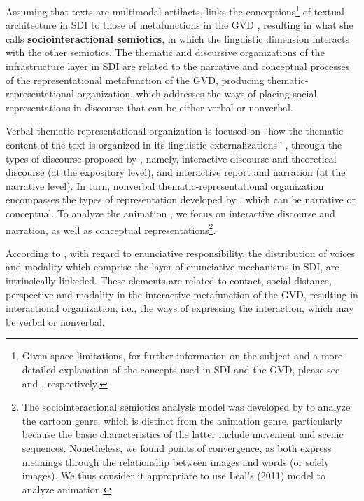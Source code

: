 \documentclass[english]{textolivre}
\begin{document}
Assuming that texts are multimodal artifacts, \textcite{leal2011organizaccao} links the conceptions\footnote{Given space limitations, for further information on the subject and a more detailed explanation of the concepts used in SDI and the GVD, please see \textcite{bronckart2012} and \textcite{kress2006reading}, respectively.} of textual architecture in SDI \cite{bronckart2012} to those of metafunctions in the GVD \cite{kress2006reading}, resulting in what she calls \textbf{sociointeractional semiotics}, in which the linguistic dimension interacts with the other semiotics. The thematic and discursive organizations of the infrastructure layer in SDI are related to the narrative and conceptual processes of the representational metafunction of the GVD, producing thematic-representational organization, which addresses the ways of placing social representations in discourse that can be either verbal or nonverbal. 

Verbal thematic-representational organization is focused on “how the thematic content of the text is organized in its linguistic externalizations” \cite[p. 206]{leal2011organizaccao}, through the types of discourse proposed by \textcite{bronckart2012}, namely, interactive discourse and theoretical discourse (at the expository level), and interactive report and narration (at the narrative level). In turn, nonverbal thematic-representational organization encompasses the types of representation developed by \textcite{kress2006reading}, which can be narrative or conceptual. To analyze the animation \textcite{purl}, we focus on interactive discourse and narration, as well as conceptual representations\footnote{The sociointeractional semiotics analysis model was developed by \textcite{leal2011organizaccao} to analyze the cartoon genre, which is distinct from the animation genre, particularly because the basic characteristics of the latter include movement and scenic sequences. Nonetheless, we found points of convergence, as both express meanings through the relationship between images and words (or solely images). We thus consider it appropriate to use Leal’s (2011) model to analyze animation.}. 

According to \textcite{leal2011organizaccao}, with regard to enunciative responsibility, the distribution of voices and modality which comprise the layer of enunciative mechanisms in SDI, are intrinsically linkeded. These elements are related to contact, social distance, perspective and modality in the interactive metafunction of the GVD, resulting in interactional organization, i.e., the ways of expressing the interaction, which may be verbal or nonverbal.
\end{document}
